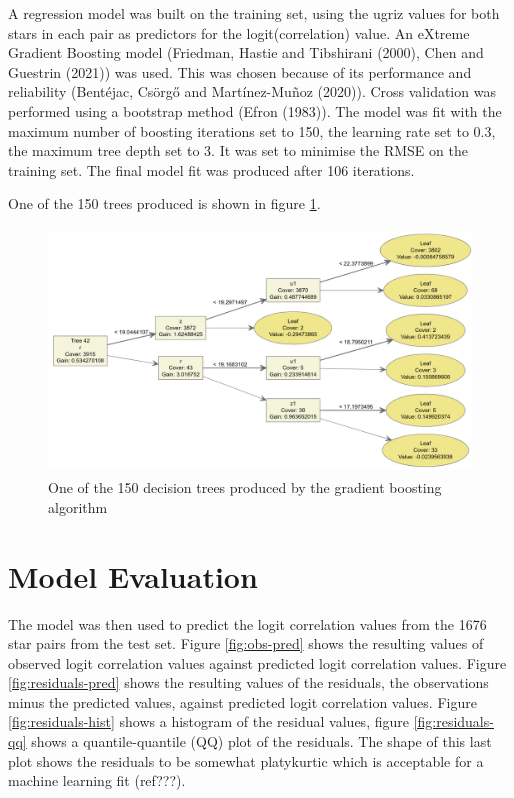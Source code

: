 \documentclass[a4paper,fleqn,usenatbib]{mnras}
\begin{document}
A regression model was built on the training set, using the ugriz values
for both stars in each pair as predictors for the logit(correlation)
value. An eXtreme Gradient Boosting model (Friedman, Hastie and
Tibshirani (2000), Chen and Guestrin (2021)) was used. This was chosen
because of its performance and reliability (Bentéjac, Csörgő and
Martínez-Muñoz (2020)). Cross validation was performed using a bootstrap
method (Efron (1983)). The model was fit with the maximum number of
boosting iterations set to 150, the learning rate set to 0.3, the
maximum tree depth set to 3. It was set to minimise the RMSE on the
training set. The final model fit was produced after 106 iterations.

One of the 150 trees produced is shown in figure \ref{fig:tree}.

\begin{figure}
  \includegraphics[width=\columnwidth, height = 6.5cm]{figures/tree}
    \caption{One of the 150 decision trees produced by the gradient boosting algorithm}
    \label{fig:tree}
\end{figure}

\hypertarget{model-evaluation}{%
\section{Model Evaluation}\label{model-evaluation}}

The model was then used to predict the logit correlation values from the
1676 star pairs from the test set. Figure \ref{fig:obs-pred} shows the
resulting values of observed logit correlation values against predicted
logit correlation values. Figure \ref{fig:residuals-pred} shows the
resulting values of the residuals, the observations minus the predicted
values, against predicted logit correlation values. Figure
\ref{fig:residuals-hist} shows a histogram of the residual values,
figure \ref{fig:residuals-qq} shows a quantile-quantile (QQ) plot of the
residuals. The shape of this last plot shows the residuals to be
somewhat platykurtic which is acceptable for a machine learning fit
(ref???).
\end{document}
